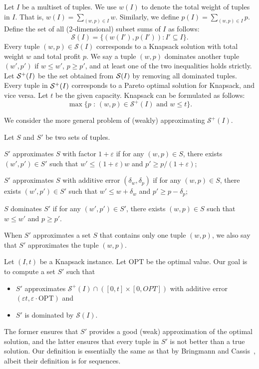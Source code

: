 \documentclass[a4paper,UKenglish,cleveref, autoref, thm-restate, pdfa]{lipics-v2021}
\newcommand{\eps}{\varepsilon}
\renewcommand{\leq}{\leqslant}
\renewcommand{\geq}{\geqslant}
\begin{document}
Let $I$ be a multiset of tuples. We use $w(I)$ to denote the total weight of tuples in $I$. That is, $w(I) = \sum_{(w,p)\in I}w$. Similarly, we define $p(I) = \sum_{(w,p)\in I}p$. Define the set of all (2-dimensional) subset sums of $I$ as follows:
\[
    \mathcal{S}(I) = \{(w(I'), p(I')) : I' \subseteq I\}.
\]
Every tuple $(w, p) \in \mathcal{S}(I)$ corresponds to a Knapsack solution with total weight $w$ and total profit $p$. We say a tuple $(w, p)$ dominates another tuple $(w', p')$ if $w \leq w'$,  $p \geq p'$, and at least one of the two inequalities holds strictly. Let ${\cal S}^+(I)$ be the set obtained from ${\cal S}(I)$ by removing all dominated tuples.
Every tuple in ${\cal S}^+(I)$ corresponds to a Pareto optimal solution for Knapsack, and vice versa. Let $t$ be the given capacity. Knapsack can be formulated as follows:
\[
    \max\{\text{$p$ : $(w, p) \in \mathcal{S}^+(I)$ and $w \leq t$}\}.
\]

We consider the more general problem of (weakly) approximating $\mathcal{S}^+(I)$.
\begin{definition}\label{def:approx-set}
    Let $S$ and $S'$ be two sets of tuples. 
    \begin{romanenumerate}
        \item $S'$ approximates $S$ with factor $1 + \eps$ if for any $(w,p) \in S$, there exists $(w', p') \in S'$ such that $w' \leq (1 + \eps)w$ and $p' \geq p/(1 + \eps)$;

        \item  $S'$ approximates $S$ with additive error $(\delta_w, \delta_p)$ if for any $(w,p) \in S$, there exists $(w' , p') \in S'$ such that $w' \leq w + \delta_w$ and $p' \geq p - \delta_p$;

        \item  $S$ dominates $S'$ if for any $(w', p') \in S'$, there exists $(w, p) \in S$ such that $w \leq w'$ and $p \geq p'$.
    \end{romanenumerate}
\end{definition}
When $S'$ approximates a set $S$ that contains only one tuple $(w,p)$, we also say that $S'$ approximates the tuple $(w,p)$.

Let $(I,t)$ be a Knapsack instance. Let $\mathrm{OPT}$ be the optimal value. Our goal is to compute a set $S'$ such that 
\begin{itemize}
    \item $S'$ approximates $\mathcal{S}^+(I) \cap ([0, t]\times [0, OPT])$ with additive error $(\eps t, \eps \cdot \mathrm{OPT})$ and 

    \item $S'$ is dominated by $\mathcal{S}(I)$.
\end{itemize}
The former ensures that $S'$ provides a good (weak) approximation of the optimal solution, and the latter ensures that every tuple in $S'$ is not better than a true solution. Our definition is essentially the same as that by Bringmann and Cassis~\cite{BC22}, albeit their definition is for sequences.
\end{document}
